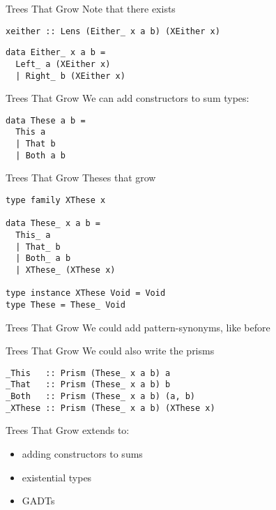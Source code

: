 \begin{frame}[fragile]
\begin{block}{Trees That Grow}
Note that there exists
\begin{lstlisting}[style=haskell]
xeither :: Lens (Either_ x a b) (XEither x)
\end{lstlisting}
\begin{lstlisting}[style=haskell]
data Either_ x a b =
  Left_ a (XEither x)
  | Right_ b (XEither x)
\end{lstlisting}
\end{block}
\end{frame}
\begin{frame}[fragile]

\begin{block}{Trees That Grow}
We can add constructors to sum types:
\begin{lstlisting}[style=haskell]
data These a b =
  This a
  | That b
  | Both a b
\end{lstlisting}
\end{block}
\end{frame}

\begin{frame}[fragile]
\begin{block}{Trees That Grow}
Theses that grow
\begin{lstlisting}[style=haskell]
type family XThese x

data These_ x a b =
  This_ a
  | That_ b
  | Both_ a b
  | XThese_ (XThese x)

type instance XThese Void = Void
type These = These_ Void
\end{lstlisting}
\end{block}
\end{frame}

\begin{frame}[fragile]
\begin{block}{Trees That Grow}
We could add pattern-synonyms, like before
\end{block}
\end{frame}
 
\begin{frame}[fragile]
\begin{block}{Trees That Grow}
We could also write the prisms
\begin{lstlisting}[style=haskell]
_This   :: Prism (These_ x a b) a
_That   :: Prism (These_ x a b) b
_Both   :: Prism (These_ x a b) (a, b)
_XThese :: Prism (These_ x a b) (XThese x)
\end{lstlisting}
\end{block}
\end{frame}

\begin{frame}[fragile]
\begin{center}
Trees That Grow extends to:\cite{najd2016trees}
\begin{itemize}
\item adding constructors to sums
\item existential types
\item GADTs
\end{itemize}
\end{center}
\end{frame}
